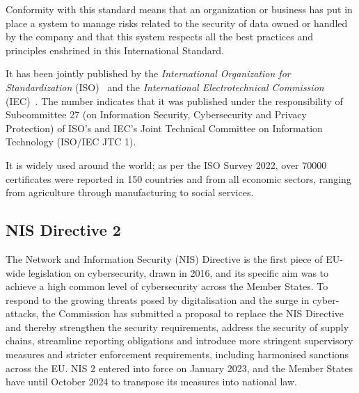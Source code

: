 Conformity with this standard means that an organization or business has put in place a system to manage risks related to the security of data owned or handled by the company and that this system respects all the best practices and principles enshrined in this International Standard.

It has been jointly published by the \textit{International Organization for Standardization} (ISO)~\cite{iso} and the \textit{International Electrotechnical Commission} (IEC)~\cite{iec}. The number indicates that it was published under the responsibility of Subcommittee 27 (on Information Security, Cybersecurity and Privacy Protection) of ISO's and IEC's Joint Technical Committee on Information Technology (ISO/IEC JTC 1).

It is widely used around the world; as per the ISO Survey 2022, over 70000 certificates were reported in 150 countries and from all economic sectors, ranging from agriculture through manufacturing to social services.~\cite{iso-27001}

\subsection{NIS Directive 2}
\label{sec:nis-directive-2}

The Network and Information Security (NIS) Directive is the first piece of EU-wide legislation on cybersecurity, drawn in 2016, and its specific aim was to achieve a high common level of cybersecurity across the Member States. To respond to the growing threats posed by digitalisation and the surge in cyber-attacks, the Commission has submitted a proposal to replace the NIS Directive and thereby strengthen the security requirements, address the security of supply chains, streamline reporting obligations and introduce more stringent supervisory measures and stricter enforcement requirements, including harmonised sanctions across the EU. NIS 2 entered into force on January 2023, and the Member States have until October 2024 to transpose its measures into national law.

